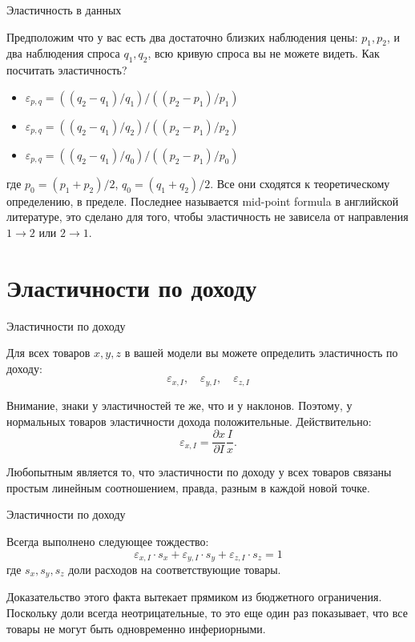 \documentclass{beamer}
\begin{document}
\begin{frame}{Эластичность в данных}

Предположим что у вас есть два достаточно близких наблюдения цены: $p_1, p_2$, и два наблюдения спроса $q_1, q_2$, всю кривую спроса вы не можете видеть. Как посчитать эластичность?
	
	\begin{itemize}
	\item $\varepsilon_{p,q} = ((q_2 - q_1)/q_1)/((p_2-p_1)/p_1)$
	\item $\varepsilon_{p,q} = ((q_2 - q_1)/q_2)/((p_2-p_1)/p_2)$
	\item $\varepsilon_{p,q} = ((q_2 - q_1)/q_0)/((p_2-p_1)/p_0)$
	\end{itemize}
	
	где $p_0 = (p_1 + p_2)/2$, $q_0 = (q_1+q_2)/2$. Все они сходятся к теоретическому определению, в пределе. Последнее называется \alert{mid-point formula} в английской литературе, это сделано для того, чтобы эластичность не зависела от направления $1 \to 2$ или $2 \to 1$.
	
\end{frame}

\section{Эластичности по доходу}

\begin{frame}{Эластичности по доходу}

Для всех товаров $x,y,z$ в вашей модели вы можете определить эластичность по доходу:
$$\varepsilon_{x,I}, \quad \varepsilon_{y,I}, \quad \varepsilon_{z,I}$$

Внимание, \alert{знаки у эластичностей те же, что и у наклонов}. Поэтому, у нормальных товаров эластичности дохода положительные. Действительно:
$$\varepsilon_{x,I} = \frac{\partial x}{\partial I} \frac{I}{x}.$$

Любопытным является то, что эластичности по доходу у всех товаров связаны простым линейным соотношением, правда, разным в каждой новой точке.

\end{frame}

\begin{frame}{Эластичности по доходу}

\begin{lemma}
Всегда выполнено следующее тождество:
$$\varepsilon_{x,I} \cdot s_x + \varepsilon_{y,I} \cdot s_y + \varepsilon_{z,I} \cdot s_z = 1$$
где $s_x, s_y, s_z$ доли расходов на соответствующие товары.
\end{lemma}

Доказательство этого факта вытекает прямиком из бюджетного ограничения. Поскольку доли всегда неотрицательные, то это еще один раз показывает, что \alert{все товары не могут быть одновременно инфериорными}.

\end{frame}
\end{document}

